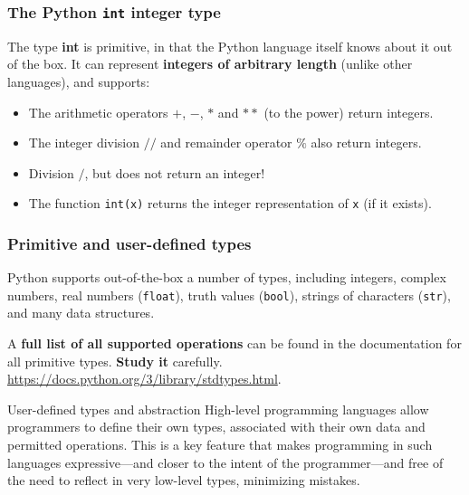 \documentclass{beamer} %
\newcommand\emc[1]{\textcolor{midred}{\textbf{#1}}}
\begin{document}
\begin{frame}
\frametitle{The Python \texttt{int} integer type} 

The type \emc{int} is primitive, in that the Python language itself knows about it out of the box. It can represent \emc{integers of arbitrary length} (unlike other languages), and supports:
\begin{itemize}
\item The arithmetic operators $+$, $-$, $*$ and $**$ (to the power) return integers.
\item The integer division $//$ and remainder operator $\%$ also return integers.
\item Division $/$, but does not return an integer!
\item The function \texttt{int(x)} returns the integer representation of \texttt{x} (if it exists).
\end{itemize}

\end{frame}

\begin{frame}
\frametitle{Primitive and user-defined types} 

Python supports out-of-the-box a number of types, including integers, complex numbers, real numbers (\texttt{float}), truth values (\texttt{bool}), strings of characters (\texttt{str}), and many data structures.

\vspace{5mm}
A \emc{full list of all supported operations} can be found in the documentation for all primitive types. \emc{Study it} carefully. \url{https://docs.python.org/3/library/stdtypes.html}.


\begin{block}{User-defined types and abstraction}
High-level programming languages allow programmers to define their own types, associated with their own data and permitted operations. This is a key feature that makes programming in such languages expressive---and closer to the intent of the programmer---and free of the need to reflect in very low-level types, minimizing mistakes.
\end{block}

\end{frame}
\end{document}
